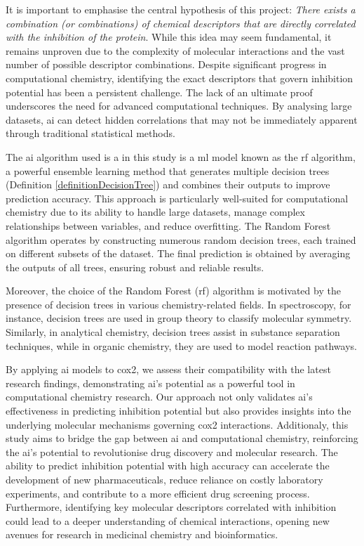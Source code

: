 \documentclass[11pt]{article}
\begin{document}
It is important to emphasise the central hypothesis of this project: \emph{There exists a combination (or combinations) of chemical descriptors that are directly correlated with the inhibition of the protein}. While this idea may seem fundamental, it remains unproven due to the complexity of molecular interactions and the vast number of possible descriptor combinations. Despite significant progress in computational chemistry, identifying the exact descriptors that govern inhibition potential has been a persistent challenge. The lack of an ultimate proof underscores the need for advanced computational techniques. By analysing large datasets, \gls{ai} can detect hidden correlations that may not be immediately apparent through traditional statistical methods.

The \gls{ai} algorithm used is a in this study is a \gls{ml} model known as the \gls{rf} algorithm\cite{MachineLearningRandomForest}, a powerful ensemble learning method that generates multiple decision trees (Definition \ref{definitionDecisionTree}) and combines their outputs to improve prediction accuracy. This approach is particularly well-suited for computational chemistry due to its ability to handle large datasets, manage complex relationships between variables, and reduce overfitting. The Random Forest algorithm operates by constructing numerous random decision trees, each trained on different subsets of the dataset. The final prediction is obtained by averaging the outputs of all trees, ensuring robust and reliable results.

Moreover, the choice of the Random Forest (\gls{rf}) algorithm is motivated by the presence of decision trees in various chemistry-related fields. In spectroscopy, for instance, decision trees are used in group theory to classify molecular symmetry. Similarly, in analytical chemistry, decision trees assist in substance separation techniques, while in organic chemistry, they are used to model reaction pathways.

By applying \gls{ai} models to \gls{cox2}, we assess their compatibility with the latest research findings\cite{Cox2InhibitorsReview}, demonstrating \gls{ai}’s potential as a powerful tool in computational chemistry research. Our approach not only validates \gls{ai}’s effectiveness in predicting inhibition potential but also provides insights into the underlying molecular mechanisms governing \gls{cox2} interactions. Additionaly, this study aims to bridge the gap between \gls{ai} and computational chemistry, reinforcing the \gls{ai}’s potential to revolutionise drug discovery and molecular research. The ability to predict inhibition potential with high accuracy can accelerate the development of new pharmaceuticals, reduce reliance on costly laboratory experiments, and contribute to a more efficient drug screening process. Furthermore, identifying key molecular descriptors correlated with inhibition could lead to a deeper understanding of chemical interactions, opening new avenues for research in medicinal chemistry and bioinformatics.
\end{document}
